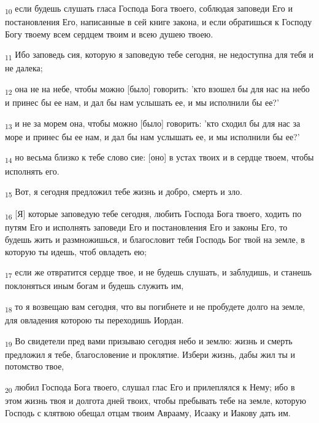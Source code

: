\begin{tcolorbox}
\textsubscript{10} если будешь слушать гласа Господа Бога твоего, соблюдая заповеди Его и постановления Его, написанные в сей книге закона, и если обратишься к Господу Богу твоему всем сердцем твоим и всею душею твоею.
\end{tcolorbox}
\begin{tcolorbox}
\textsubscript{11} Ибо заповедь сия, которую я заповедую тебе сегодня, не недоступна для тебя и не далека;
\end{tcolorbox}
\begin{tcolorbox}
\textsubscript{12} она не на небе, чтобы можно [было] говорить: 'кто взошел бы для нас на небо и принес бы ее нам, и дал бы нам услышать ее, и мы исполнили бы ее?'
\end{tcolorbox}
\begin{tcolorbox}
\textsubscript{13} и не за морем она, чтобы можно [было] говорить: 'кто сходил бы для нас за море и принес бы ее нам, и дал бы нам услышать ее, и мы исполнили бы ее?'
\end{tcolorbox}
\begin{tcolorbox}
\textsubscript{14} но весьма близко к тебе слово сие: [оно] в устах твоих и в сердце твоем, чтобы исполнять его.
\end{tcolorbox}
\begin{tcolorbox}
\textsubscript{15} Вот, я сегодня предложил тебе жизнь и добро, смерть и зло.
\end{tcolorbox}
\begin{tcolorbox}
\textsubscript{16} [Я] которые заповедую тебе сегодня, любить Господа Бога твоего, ходить по путям Его и исполнять заповеди Его и постановления Его и законы Его, то будешь жить и размножишься, и благословит тебя Господь Бог твой на земле, в которую ты идешь, чтоб овладеть ею;
\end{tcolorbox}
\begin{tcolorbox}
\textsubscript{17} если же отвратится сердце твое, и не будешь слушать, и заблудишь, и станешь поклоняться иным богам и будешь служить им,
\end{tcolorbox}
\begin{tcolorbox}
\textsubscript{18} то я возвещаю вам сегодня, что вы погибнете и не пробудете долго на земле, для овладения которою ты переходишь Иордан.
\end{tcolorbox}
\begin{tcolorbox}
\textsubscript{19} Во свидетели пред вами призываю сегодня небо и землю: жизнь и смерть предложил я тебе, благословение и проклятие. Избери жизнь, дабы жил ты и потомство твое,
\end{tcolorbox}
\begin{tcolorbox}
\textsubscript{20} любил Господа Бога твоего, слушал глас Его и прилеплялся к Нему; ибо в этом жизнь твоя и долгота дней твоих, чтобы пребывать тебе на земле, которую Господь с клятвою обещал отцам твоим Аврааму, Исааку и Иакову дать им.
\end{tcolorbox}
